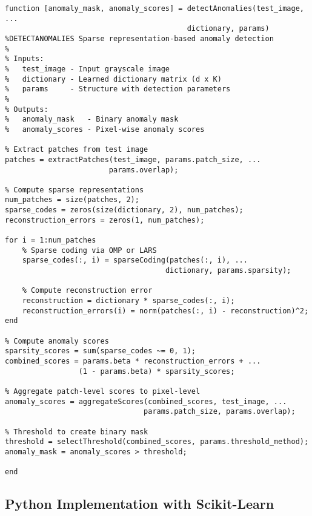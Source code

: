 \documentclass[12pt]{article}
\begin{document}
\begin{verbatim}
function [anomaly_mask, anomaly_scores] = detectAnomalies(test_image, ...
                                          dictionary, params)
%DETECTANOMALIES Sparse representation-based anomaly detection
%
% Inputs:
%   test_image - Input grayscale image
%   dictionary - Learned dictionary matrix (d x K)
%   params     - Structure with detection parameters
%
% Outputs:
%   anomaly_mask   - Binary anomaly mask
%   anomaly_scores - Pixel-wise anomaly scores

% Extract patches from test image
patches = extractPatches(test_image, params.patch_size, ...
                        params.overlap);

% Compute sparse representations
num_patches = size(patches, 2);
sparse_codes = zeros(size(dictionary, 2), num_patches);
reconstruction_errors = zeros(1, num_patches);

for i = 1:num_patches
    % Sparse coding via OMP or LARS
    sparse_codes(:, i) = sparseCoding(patches(:, i), ...
                                     dictionary, params.sparsity);
    
    % Compute reconstruction error
    reconstruction = dictionary * sparse_codes(:, i);
    reconstruction_errors(i) = norm(patches(:, i) - reconstruction)^2;
end

% Compute anomaly scores
sparsity_scores = sum(sparse_codes ~= 0, 1);
combined_scores = params.beta * reconstruction_errors + ...
                 (1 - params.beta) * sparsity_scores;

% Aggregate patch-level scores to pixel-level
anomaly_scores = aggregateScores(combined_scores, test_image, ...
                                params.patch_size, params.overlap);

% Threshold to create binary mask
threshold = selectThreshold(combined_scores, params.threshold_method);
anomaly_mask = anomaly_scores > threshold;

end
\end{verbatim}

\subsection{Python Implementation with Scikit-Learn}
\label{app:python_implementation}
\end{document}
